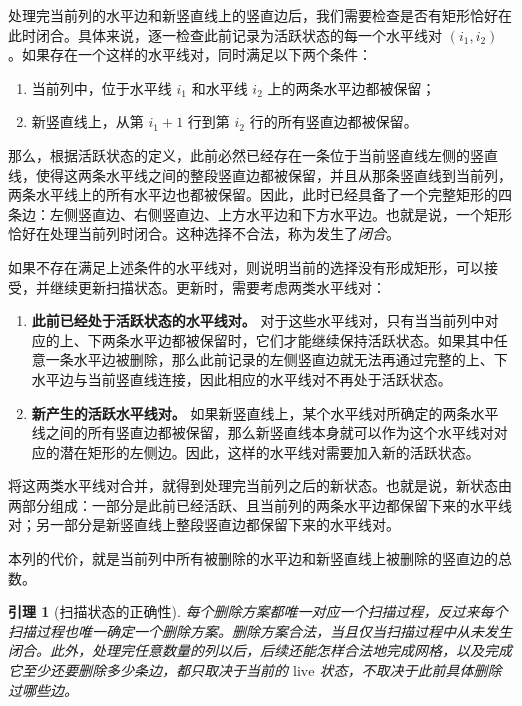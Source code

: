 \documentclass[11pt]{ctexart}
\renewenvironment{quote}{\begin{markdownquote}}{\end{markdownquote}}
\newtheorem{lemma}[theorem]{引理}
\theoremstyle{definition}
\begin{document}
\begin{quote}
    处理完当前列的水平边和新竖直线上的竖直边后，我们需要检查是否有矩形恰好在此时闭合。具体来说，逐一检查此前记录为活跃状态的每一个水平线对 $(i_1,i_2)$。如果存在一个这样的水平线对，同时满足以下两个条件：

\begin{enumerate}
    \item 当前列中，位于水平线 $i_1$ 和水平线 $i_2$ 上的两条水平边都被保留；
    \item 新竖直线上，从第 $i_1+1$ 行到第 $i_2$ 行的所有竖直边都被保留。
\end{enumerate}

那么，根据活跃状态的定义，此前必然已经存在一条位于当前竖直线左侧的竖直线，使得这两条水平线之间的整段竖直边都被保留，并且从那条竖直线到当前列，两条水平线上的所有水平边也都被保留。因此，此时已经具备了一个完整矩形的四条边：左侧竖直边、右侧竖直边、上方水平边和下方水平边。也就是说，一个矩形恰好在处理当前列时闭合。这种选择不合法，称为发生了\emph{闭合}。

如果不存在满足上述条件的水平线对，则说明当前的选择没有形成矩形，可以接受，并继续更新扫描状态。更新时，需要考虑两类水平线对：

\begin{enumerate}
    \item \textbf{此前已经处于活跃状态的水平线对。}
    对于这些水平线对，只有当当前列中对应的上、下两条水平边都被保留时，它们才能继续保持活跃状态。如果其中任意一条水平边被删除，那么此前记录的左侧竖直边就无法再通过完整的上、下水平边与当前竖直线连接，因此相应的水平线对不再处于活跃状态。

    \item \textbf{新产生的活跃水平线对。}
    如果新竖直线上，某个水平线对所确定的两条水平线之间的所有竖直边都被保留，那么新竖直线本身就可以作为这个水平线对对应的潜在矩形的左侧边。因此，这样的水平线对需要加入新的活跃状态。
\end{enumerate}

将这两类水平线对合并，就得到处理完当前列之后的新状态。也就是说，新状态由两部分组成：一部分是此前已经活跃、且当前列的两条水平边都保留下来的水平线对；另一部分是新竖直线上整段竖直边都保留下来的水平线对。

本列的代价，就是当前列中所有被删除的水平边和新竖直线上被删除的竖直边的总数。
\end{quote}

\begin{lemma}[扫描状态的正确性]\label{lem:exact}
每个删除方案都唯一对应一个扫描过程，反过来每个扫描过程也唯一确定一个删除方案。删除方案合法，当且仅当扫描过程中从未发生闭合。此外，处理完任意数量的列以后，后续还能怎样合法地完成网格，以及完成它至少还要删除多少条边，都只取决于当前的 $\mathrm{live}$ 状态，不取决于此前具体删除过哪些边。
\end{lemma}
\end{document}
